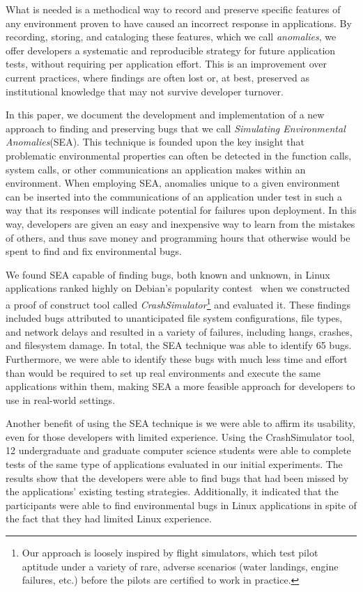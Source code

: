 What is needed is a methodical way to record and preserve specific features of any environment proven to have caused an incorrect response in applications. By recording,
storing, and cataloging these features, which we call \textit{anomalies}, we offer developers a
systematic and reproducible strategy for future application tests, without requiring per application effort. This is an improvement over current practices, where findings are often lost or, at best, preserved as institutional knowledge that may not survive developer turnover.

In  this paper, we document the development and implementation of a new
approach to finding and preserving bugs that we call \textit{Simulating
Environmental Anomalies}(SEA). This technique is founded upon the key
insight that problematic environmental properties can often be detected
in the function calls, system
calls, or other communications an application makes within an
environment. When employing SEA, anomalies unique to a given environment
can be inserted into the communications of
an application under test in such a way that its responses will indicate
potential for failures upon deployment. In this way, developers are given
an easy and inexpensive way to learn from the mistakes of others, and
thus save money and programming hours that otherwise would be spent to
find and fix environmental bugs.

We found SEA capable of finding bugs,
both known and unknown,
in Linux applications ranked
highly on Debian’s popularity contest~\cite{DebPopCon}
when we constructed a proof of construct tool
called {\em CrashSimulator}\footnote{Our approach is
loosely inspired by flight simulators, which test pilot aptitude under a
variety of rare, adverse scenarios (water landings, engine failures,
etc.) before the pilots are certified to work in practice.}
and evaluated it.
These findings included bugs
attributed to
unanticipated file system configurations, file types, and network delays
and resulted in a variety of failures, including hangs, crashes, and
filesystem damage.  In total, the SEA technique was able to identify 65
bugs.  Furthermore, we were able to identify these bugs with much less
time and effort than would be required to set up real environments and
execute the same applications within them, making SEA a more feasible
approach for developers to use in real-world settings.

Another benefit of using the SEA technique is we were able to affirm its
usability, even for those developers with limited experience. Using the
CrashSimulator tool, 12 undergraduate and graduate computer science
students were able to complete tests of the same type of applications
evaluated in our initial experiments. The results show that the
developers were able to find bugs that had been missed by the
applications’ existing testing strategies. Additionally, it indicated that
the participants were able to find environmental bugs in
Linux applications in spite of the
fact that they had limited Linux experience.


